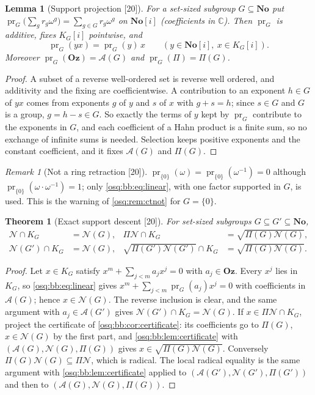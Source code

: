 \documentclass[11pt,letterpaper]{article}
\numberwithin{equation}{section}
\newtheorem{theorem}{Theorem}[section]
\newtheorem{lemma}[lemma]{Lemma}
\theoremstyle{definition}
\theoremstyle{remark}
\newtheorem{remark}[remark]{Remark}
\theoremstyle{plain}
\newcommand{\No}{\mathbf{No}}
\newcommand{\Oz}{\mathbf{Oz}}
\newcommand{\SC}{\No[i]}
\newcommand{\C}{\mathbb C}
\newcommand{\A}{\mathcal A}          %
\newcommand{\NN}{\mathcal N}         %
\newcommand{\src}[1]{\textup{\textsf{[#1]}}}
\begin{document}
\begin{lemma}[Support projection \src{20}]\label{osq:bb:lem:projection}
For a set-sized subgroup $G\subseteq\No$ put $\operatorname{pr}_G\bigl(\sum_gr_g\omega^g\bigr)=\sum_{g\in G}r_g\omega^g$ on $\SC$
(coefficients in $\C$). Then $\operatorname{pr}_G$ is additive, fixes $K_G[i]$ pointwise, and
\begin{equation}\label{osq:bb:eq:linear}
 \operatorname{pr}_G(yx)=\operatorname{pr}_G(y)\,x\qquad(y\in\SC,\ x\in K_G[i]).
\end{equation}
Moreover $\operatorname{pr}_G(\Oz)=\A(G)$ and $\operatorname{pr}_G(\Pi)=\Pi(G)$.
\end{lemma}
\begin{proof}
A subset of a reverse well-ordered set is reverse well ordered, and additivity and the fixing are coefficientwise. A contribution to
an exponent $h\in G$ of $yx$ comes from exponents $g$ of $y$ and $s$ of $x$ with $g+s=h$; since $s\in G$ and $G$ is a group,
$g=h-s\in G$. So exactly the terms of $y$ kept by $\operatorname{pr}_G$ contribute to the exponents in $G$, and each coefficient of a
Hahn product is a finite sum, so no exchange of infinite sums is needed. Selection keeps positive exponents and the constant
coefficient, and it fixes $\A(G)$ and $\Pi(G)$.
\end{proof}

\begin{remark}[Not a ring retraction \src{20}]\label{osq:bb:rem:notretraction}
$\operatorname{pr}_{\{0\}}(\omega)=\operatorname{pr}_{\{0\}}(\omega^{-1})=0$ although $\operatorname{pr}_{\{0\}}(\omega\cdot\omega^{-1})=1$; only
\eqref{osq:bb:eq:linear}, with one factor supported in $G$, is used. This is the warning of \cref{osq:rem:ctnot} for $G=\{0\}$.
\end{remark}

\begin{theorem}[Exact support descent \src{20}]\label{osq:bb:thm:descent}
For set-sized subgroups $G\subseteq G'\subseteq\No$,
\begin{align}
 \NN\cap K_G&=\NN(G),& \Pi\NN\cap K_G&=\sqrt{\Pi(G)\NN(G)},\label{osq:bb:eq:descent}\\
 \NN(G')\cap K_G&=\NN(G),& \sqrt{\Pi(G')\NN(G')}\cap K_G&=\sqrt{\Pi(G)\NN(G)}.\label{osq:bb:eq:localdescent}
\end{align}
\end{theorem}
\begin{proof}
Let $x\in K_G$ satisfy $x^m+\sum_{j<m}a_jx^j=0$ with $a_j\in\Oz$. Every $x^j$ lies in $K_G$, so \eqref{osq:bb:eq:linear} gives
$x^m+\sum_{j<m}\operatorname{pr}_G(a_j)x^j=0$ with coefficients in $\A(G)$; hence $x\in\NN(G)$. The reverse inclusion is clear, and
the same argument with $a_j\in\A(G')$ gives $\NN(G')\cap K_G=\NN(G)$. If $x\in\Pi\NN\cap K_G$, project the certificate of
\cref{osq:bb:cor:certificate}: its coefficients go to $\Pi(G)$, $x\in\NN(G)$ by the first part, and \cref{osq:bb:lem:certificate}
with $(\A(G),\NN(G),\Pi(G))$ gives $x\in\sqrt{\Pi(G)\NN(G)}$. Conversely $\Pi(G)\NN(G)\subseteq\Pi\NN$, which is radical. The local
radical equality is the same argument with \cref{osq:bb:lem:certificate} applied to $(\A(G'),\NN(G'),\Pi(G'))$ and then to
$(\A(G),\NN(G),\Pi(G))$.
\end{proof}
\end{document}
